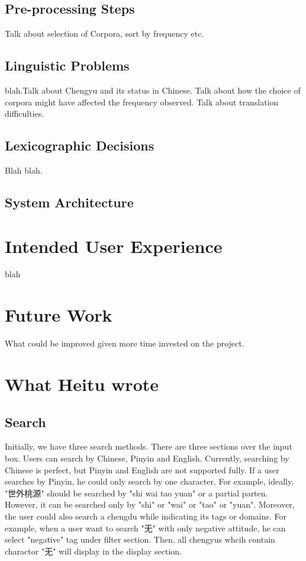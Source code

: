 \documentclass[11pt]{article} %
\begin{document}
\subsection{Pre-processing Steps}
\indent Talk about selection of Corpora, sort by frequency etc.\\

\subsection{Linguistic Problems}

\indent blah.Talk about Chengyu and its status in Chinese. Talk about how the choice of corpora might have affected the frequency observed. Talk about translation difficulties.\\

\subsection{Lexicographic Decisions}

\indent Blah blah.\\

\subsection{System Architecture}

\section{Intended User Experience}

\indent blah\\

\section{Future Work}

\indent What could be improved given more time invested on the project. 

\section{What Heitu wrote}
\subsection{Search}
\indent Initially, we have three search methods. There are three sections over the input box. Users can search by Chinese, Pinyin and English. Currently, searching by Chinese is perfect, but Pinyin and English are not supported fully. If a user searches by Pinyin, he could only search by one character. For example, ideally, "世外桃源" should be searched by "shi wai tao yuan" or a partial parten. However, it can be searched only by "shi" or "wai" or "tao" or "yuan". Moreover, the user could also search a chengdu while indicating its tags or domains. For example, when a user want to search "无" with only negative attitude, he can select "negative" tag under filter section. Then, all chengyus whcih contain charactor "无" will display in the display section. 
\end{document}
